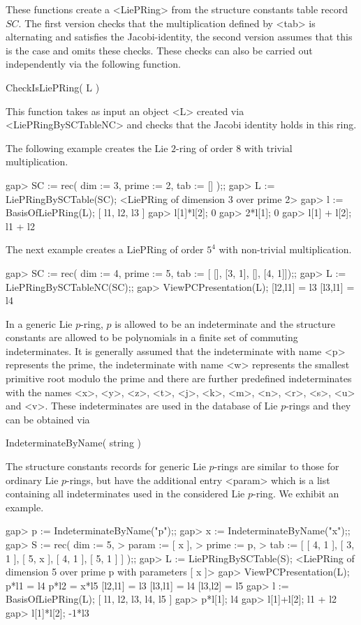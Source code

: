 These functions create a <LiePRing> from the structure constants table
record $SC$. The first version checks that the multiplication defined by
<tab> is alternating and satisfies the Jacobi-identity, the second version
assumes that this is the case and omits these checks. These checks can
also be carried out independently via the following function.

\> CheckIsLiePRing( L )

This function takes as input an object <L> created via <LiePRingBySCTableNC>
and checks that the Jacobi identity holds in this ring.

The following example creates the Lie $2$-ring of order $8$ with trivial 
multiplication.  

\beginexample
gap> SC := rec( dim := 3, prime := 2, tab := [] );;
gap> L := LiePRingBySCTable(SC);
<LiePRing of dimension 3 over prime 2>
gap> l := BasisOfLiePRing(L);
[ l1, l2, l3 ]
gap> l[1]*l[2];
0
gap> 2*l[1];
0
gap> l[1] + l[2];
l1 + l2
\endexample

The next example creates a LiePRing of order $5^4$ with non-trivial 
multiplication.

\beginexample
gap> SC := rec( dim := 4, prime := 5, tab := [ [], [3, 1], [], [4, 1]]);;
gap> L := LiePRingBySCTableNC(SC);;
gap> ViewPCPresentation(L);
[l2,l1] = l3
[l3,l1] = l4
\endexample


In a generic Lie $p$-ring, $p$ is allowed to be an indeterminate and 
the structure constants are allowed to be polynomials in a finite set of 
commuting indeterminates. It is generally assumed that the indeterminate
with name <p> represents the prime, the indeterminate with name <w> 
represents the smallest primitive root modulo the prime and there are 
further predefined indeterminates with the names <x>, <y>, <z>, <t>, 
<j>, <k>, <m>, <n>, <r>, <s>, <u> and <v>. These indeterminates are used 
in the database of Lie $p$-rings and they can be obtained via

\> IndeterminateByName( string )

The structure constants records for generic Lie $p$-rings are similar to
those for ordinary Lie $p$-rings, but have the additional entry <param>
which is a list containing all indeterminates used in the considered Lie
$p$-ring. We exhibit an example.

\beginexample
gap> p := IndeterminateByName("p");;
gap> x := IndeterminateByName("x");;
gap> S := rec( dim := 5, 
>              param := [ x ], 
>              prime := p, 
>              tab := [ [ 4, 1 ], [ 3, 1 ], [ 5, x ], [ 4, 1 ], [ 5, 1 ] ] );;
gap> L := LiePRingBySCTable(S);
<LiePRing of dimension 5 over prime p with parameters [ x ]>
gap> ViewPCPresentation(L);
p*l1 = l4
p*l2 = x*l5
[l2,l1] = l3
[l3,l1] = l4
[l3,l2] = l5
gap> l := BasisOfLiePRing(L);
[ l1, l2, l3, l4, l5 ]
gap> p*l[1];
l4
gap> l[1]+l[2];
l1 + l2
gap> l[1]*l[2];
-1*l3
\endexample

